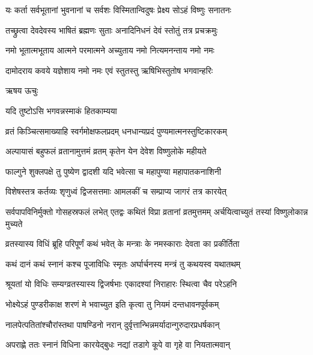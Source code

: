 \twolineshloka
{यः कर्ता सर्वभूतानां भुवनानां च सर्वशः}
{विस्मितान्विदुषः प्रेक्ष्य सोऽहं विष्णुः सनातनः}%

\twolineshloka
{तच्छ्रुत्वा देवदेवस्य भाषितं ब्रह्मणः सुताः}
{अनादिनिधनं देवं स्तोतुं तत्र प्रचक्रमुः}%

\twolineshloka
{नमो भूतात्मभूताय आत्मने परमात्मने}
{अच्युताय नमो नित्यमनन्ताय नमो नमः}%

\twolineshloka
{दामोदराय कवये यज्ञेशाय नमो नमः}
{एवं स्तुतस्तु ऋषिभिस्तुतोष भगवान्हरिः}%


{ऋषय ऊचुः}

\onelineshloka
{यदि तुष्टोऽसि भगवन्नस्माकं हितकाम्यया}%

\twolineshloka
{व्रतं किञ्चित्समाख्याहि स्वर्गमोक्षफलप्रदम्}
{धनधान्यप्रदं पुण्यमात्मनस्तुष्टिकारकम्}%

\twolineshloka
{अल्पायासं बहुफलं व्रतानामुत्तमं व्रतम्}
{कृतेन येन देवेश विष्णुलोके महीयते}%


\twolineshloka
{फाल्गुने शुक्लपक्षे तु पुष्येण द्वादशी यदि}
{भवेत्सा च महापुण्या महापातकनाशिनी}%

\twolineshloka
{विशेषस्तत्र कर्तव्यः शृणुध्वं द्विजसत्तमाः}
{आमलकीं च सम्प्राप्य जागरं तत्र कारयेत्}%

\threelineshloka
{सर्वपापविनिर्मुक्तो गोसहस्रफलं लभेत्}
{एतद्वः कथितं विप्रा व्रतानां व्रतमुत्तमम्}
{अर्चयित्वाच्युतं तस्यां विष्णुलोकान्न मुच्यते}%


\twolineshloka
{व्रतस्यास्य विधिं ब्रूहि परिपूर्णं कथं भवेत्}
{के मन्त्राः के नमस्काराः देवता का प्रकीर्तिता}%

\twolineshloka
{कथं दानं कथं स्नानं कश्च पूजाविधिः स्मृतः}
{अर्घार्चनस्य मन्त्रं तु कथयस्व यथातथम्}%


\twolineshloka
{श्रूयतां यो विधिः सम्यग्व्रतस्यास्य द्विजर्षभाः}
{एकादश्यां निराहारः स्थित्वा चैव परेऽहनि}%

\twolineshloka
{भोक्ष्येऽहं पुण्डरीकाक्ष शरणं मे भवाच्युत}
{इति कृत्वा तु नियमं दन्तधावनपूर्वकम्}%

\twolineshloka
{नालपेत्पतितांश्चौरांस्तथा पाषण्डिनो नरान्}
{दुर्वृत्तान्भिन्नमर्यादान्गुरुदारप्रधर्षकान्}%

\twolineshloka
{अपराह्णे ततः स्नानं विधिना कारयेद्बुधः}
{नद्यां तडागे कूपे वा गृहे वा नियतात्मवान्}%

